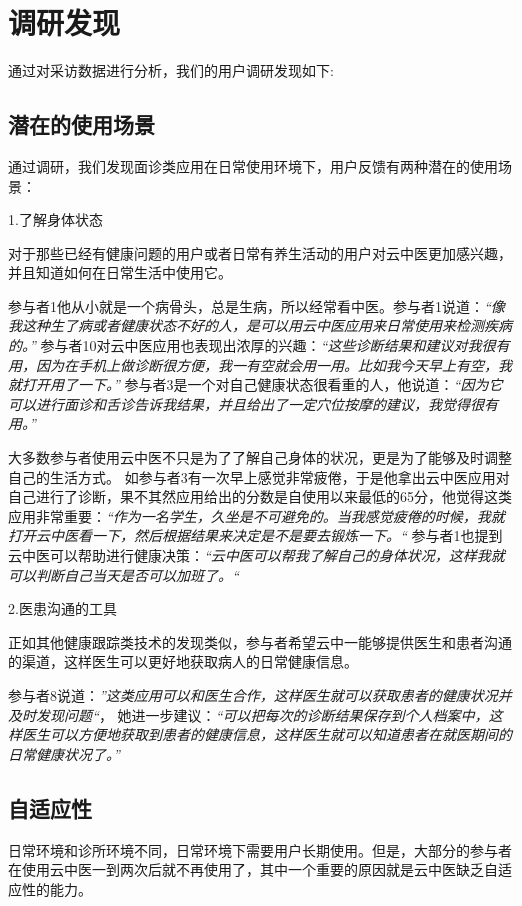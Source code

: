 \section{调研发现}
通过对采访数据进行分析，我们的用户调研发现如下:
\subsection{潜在的使用场景}
通过调研，我们发现面诊类应用在日常使用环境下，用户反馈有两种潜在的使用场景：

1.了解身体状态

对于那些已经有健康问题的用户或者日常有养生活动的用户对云中医更加感兴趣，并且知道如何在日常生活中使用它。

参与者1他从小就是一个病骨头，总是生病，所以经常看中医。参与者1说道：\textit{“像我这种生了病或者健康状态不好的人，是可以用云中医应用来日常使用来检测疾病的。”}
参与者10对云中医应用也表现出浓厚的兴趣：\textit{“这些诊断结果和建议对我很有用，因为在手机上做诊断很方便，我一有空就会用一用。比如我今天早上有空，我就打开用了一下。”}
参与者3是一个对自己健康状态很看重的人，他说道：\textit{“因为它可以进行面诊和舌诊告诉我结果，并且给出了一定穴位按摩的建议，我觉得很有用。”}

大多数参与者使用云中医不只是为了了解自己身体的状况，更是为了能够及时调整自己的生活方式。
如参与者3有一次早上感觉非常疲倦，于是他拿出云中医应用对自己进行了诊断，果不其然应用给出的分数是自使用以来最低的65分，他觉得这类应用非常重要：\textit{“作为一名学生，久坐是不可避免的。当我感觉疲倦的时候，我就打开云中医看一下，然后根据结果来决定是不是要去锻炼一下。“}
参与者1也提到云中医可以帮助进行健康决策：\textit{“云中医可以帮我了解自己的身体状况，这样我就可以判断自己当天是否可以加班了。“}


2.医患沟通的工具

正如其他健康跟踪类技术的发现类似，参与者希望云中一能够提供医生和患者沟通的渠道，这样医生可以更好地获取病人的日常健康信息。

参与者8说道：\textit{”这类应用可以和医生合作，这样医生就可以获取患者的健康状况并及时发现问题“}， 她进一步建议：\textit{“可以把每次的诊断结果保存到个人档案中，这样医生可以方便地获取到患者的健康信息，这样医生就可以知道患者在就医期间的日常健康状况了。”}

\subsection{自适应性}
日常环境和诊所环境不同，日常环境下需要用户长期使用。但是，大部分的参与者在使用云中医一到两次后就不再使用了，其中一个重要的原因就是云中医缺乏自适应性的能力。

